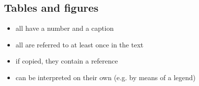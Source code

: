 \subsection{Tables and figures}
\begin{itemize}
\item all have a number and a caption
\item all are referred to at least once in the text
\item if copied, they contain a reference
\item can be interpreted on their own (e.g. by means of a legend)
\end{itemize}
